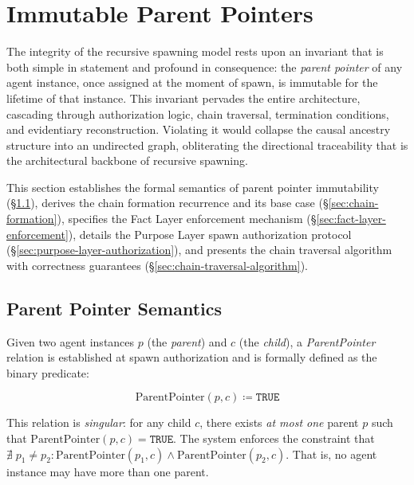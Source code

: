 \section{Immutable Parent Pointers}
\label{sec:immutable-parent-pointers}

The integrity of the recursive spawning model rests upon an invariant that is both simple in statement and profound in consequence: the \emph{parent pointer} of any agent instance, once assigned at the moment of spawn, is immutable for the lifetime of that instance. This invariant pervades the entire architecture, cascading through authorization logic, chain traversal, termination conditions, and evidentiary reconstruction. Violating it would collapse the causal ancestry structure into an undirected graph, obliterating the directional traceability that is the architectural backbone of recursive spawning.

This section establishes the formal semantics of parent pointer immutability (\S\ref{sec:parent-pointer-semantics}), derives the chain formation recurrence and its base case (\S\ref{sec:chain-formation}), specifies the Fact Layer enforcement mechanism (\S\ref{sec:fact-layer-enforcement}), details the Purpose Layer spawn authorization protocol (\S\ref{sec:purpose-layer-authorization}), and presents the chain traversal algorithm with correctness guarantees (\S\ref{sec:chain-traversal-algorithm}).

\subsection{Parent Pointer Semantics}
\label{sec:parent-pointer-semantics}

\begin{definition}
\label{def:parent-pointer}
Given two agent instances $p$ (the \emph{parent}) and $c$ (the \emph{child}), a \emph{ParentPointer} relation is established at spawn authorization and is formally defined as the binary predicate:

\[
\text{ParentPointer}(p, c) \coloneqq \texttt{TRUE}
\]

This relation is \emph{singular}: for any child $c$, there exists \emph{at most one} parent $p$ such that $\text{ParentPointer}(p, c) = \texttt{TRUE}$. The system enforces the constraint that $\nexists\; p_1 \neq p_2 : \text{ParentPointer}(p_1, c) \land \text{ParentPointer}(p_2, c)$. That is, no agent instance may have more than one parent.
\end{definition}

